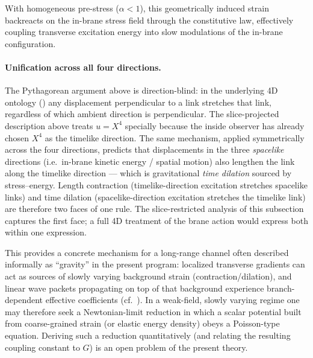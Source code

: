 With homogeneous pre-stress ($\alpha<1$), this geometrically induced strain backreacts on the in-brane stress field
through the constitutive law, effectively coupling transverse excitation energy into slow modulations of the
in-brane configuration.

\paragraph{Unification across all four directions.}
The Pythagorean argument above is direction-blind: in the underlying 4D ontology () any displacement perpendicular to a link stretches that link, regardless of which ambient direction is perpendicular.
The slice-projected description above treats $u=X^4$ specially because the inside observer has already chosen $X^4$ as the timelike direction.
The same mechanism, applied symmetrically across the four directions, predicts that displacements in the three \emph{spacelike} directions (i.e.\ in-brane kinetic energy / spatial motion) also lengthen the link along the timelike direction --- which is gravitational \emph{time dilation} sourced by stress--energy.
Length contraction (timelike-direction excitation stretches spacelike links) and time dilation (spacelike-direction excitation stretches the timelike link) are therefore two faces of one rule.
The slice-restricted analysis of this subsection captures the first face; a full 4D treatment of the brane action would express both within one expression.

This provides a concrete mechanism for a long-range channel often described informally as ``gravity'' in the present
program: localized transverse gradients can act as sources of slowly varying background strain (contraction/dilation),
and linear wave packets propagating on top of that background experience branch-dependent effective coefficients
(cf.\ ).
In a weak-field, slowly varying regime one may therefore seek a Newtonian-limit reduction in which a scalar potential
built from coarse-grained strain (or elastic energy density) obeys a Poisson-type equation.
Deriving such a reduction quantitatively (and relating the resulting coupling constant to $G$) is an open problem of
the present theory.
